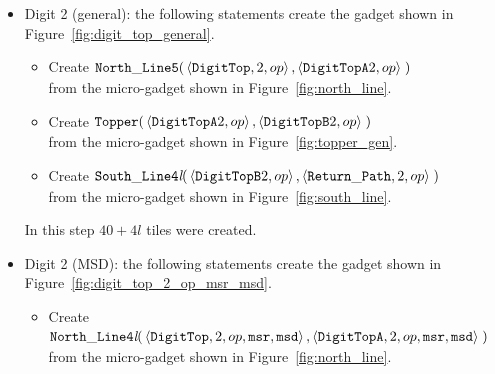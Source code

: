 \begin{itemize}
        \item Digit 2 (general): the following statements create the gadget shown in Figure~\ref{fig:digit_top_general}.
        \begin{itemize}
            \item Create
            $\begin{aligned}[t]
                {\tt North\_Line5}(& \left\langle {\tt DigitTop}, 2, op \right\rangle,
                                     \left\langle {\tt DigitTopA} 2, op \right\rangle \;)
            \end{aligned}$\\from the micro-gadget shown in Figure~\ref{fig:north_line}.

            \item Create
            $\begin{aligned}[t]
                {\tt Topper}(& \left\langle {\tt DigitTopA} 2, op \right\rangle,
                               \left\langle {\tt DigitTopB} 2, op \right\rangle \;)
            \end{aligned}$\\from the micro-gadget shown in Figure~\ref{fig:topper_gen}.

            \item Create
            $\begin{aligned}[t]
                {\tt South\_Line4\textit{l}}(& \left\langle {\tt DigitTopB} 2, op \right\rangle,
                                               \left\langle {\tt Return\_Path},    2, op \right\rangle \;)
            \end{aligned}$\\from the micro-gadget shown in Figure~\ref{fig:south_line}.
        \end{itemize}
        In this step $40 + 4l$ tiles were created.
        \vspace{1cm}


        \item Digit 2 (MSD): the following statements create the gadget shown in Figure~\ref{fig:digit_top_2_op_msr_msd}.
        \begin{itemize}
            \item Create
            $\begin{aligned}[t]
                {\tt North\_Line4\textit{l}}(& \left\langle {\tt DigitTop},  2, op, {\tt msr}, {\tt msd} \right\rangle,
                                               \left\langle {\tt DigitTopA}, 2, op, {\tt msr}, {\tt msd} \right\rangle\;)
            \end{aligned}$\\ from the micro-gadget shown in Figure~\ref{fig:north_line}.


\end{itemize}
\end{itemize}
